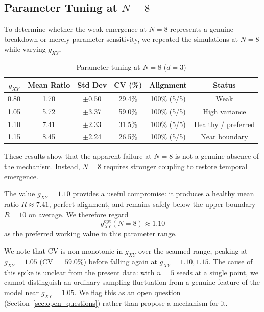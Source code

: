 \documentclass[12pt,a4paper]{article}
\begin{document}
\subsection{Parameter Tuning at $N=8$}\label{sec:n8_tuning}

To determine whether the weak emergence at $N=8$ represents a genuine
breakdown or merely parameter sensitivity, we repeated the simulations at
$N=8$ while varying $g_{XY}$.

\begin{table}[ht]
\centering
\caption{Parameter tuning at $N=8$ ($d=3$)}
\label{tab:n8_tuning}
\begin{tabular}{cccccc}
\toprule
$g_{XY}$ & Mean Ratio & Std Dev & CV (\%) & Alignment & Status \\
\midrule
0.80 & 1.70 & $\pm$0.50 & 29.4\% & 100\% (5/5) & Weak \\
1.05 & 5.72 & $\pm$3.37 & 59.0\% & 100\% (5/5) & High variance \\
1.10 & 7.41 & $\pm$2.33 & 31.5\% & 100\% (5/5) & Healthy / preferred \\
1.15 & 8.45 & $\pm$2.24 & 26.5\% & 100\% (5/5) & Near boundary \\
\bottomrule
\end{tabular}
\end{table}

These results show that the apparent failure at $N=8$ is not a genuine
absence of the mechanism. Instead, $N=8$ requires stronger coupling to
restore temporal emergence.

The value $g_{XY}=1.10$ provides a useful compromise: it produces a healthy
mean ratio $R \approx 7.41$, perfect alignment, and remains safely below the
upper boundary $R=10$ on average. We therefore regard
\[
g_{XY}^{\mathrm{opt}}(N=8) \approx 1.10
\]
as the preferred working value in this parameter range.

We note that CV is non-monotonic in $g_{XY}$ over the scanned range,
peaking at $g_{XY}=1.05$ (CV $=59.0\%$) before falling again at
$g_{XY}=1.10, 1.15$. The cause of this spike is unclear from the present
data: with $n=5$ seeds at a single point, we cannot distinguish an
ordinary sampling fluctuation from a genuine feature of the model near
$g_{XY}=1.05$. We flag this as an open question (Section~\ref{sec:open_questions})
rather than propose a mechanism for it.
\end{document}
